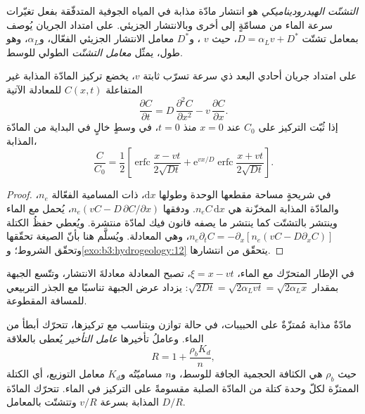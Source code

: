 \begin{definition}\label{def:b3:hydrogeology:ade}
\emph{التشتّت الهيدروديناميكي} هو
انتشار مادّة مذابة في المياه الجوفية المتدفّقة بفعل تغيّرات
سرعة الماء من مسامّةٍ إلى أخرى وبالانتشار الجزيئي. على امتداد
الجريان يُوصف بمعامل تشتّت $D = \alpha_Lv + D^*$،
حيث $v$ ، و$D^*$ معامل الانتشار الجزيئي الفعّال،
و$\alpha_L$، وهو طول، يمثّل
\emph{معامل التشتّت} الطولي للوسط.
\end{definition}

\begin{theorem}\label{thm:b3:hydrogeology:ade}
على امتداد جريان أحادي البعد ذي سرعة تسرّب ثابتة $v$، يخضع
تركيز المادّة المذابة غير المتفاعلة $C(x, t)$ للمعادلة الآتية
\[
\frac{\partial C}{\partial t} = D\,\frac{\partial^2C}{\partial x^2} -
v\,\frac{\partial C}{\partial x} .
\]
إذا ثُبّت التركيز على $C_0$ عند $x = 0$ منذ $t = 0$، في وسطٍ
خالٍ في البداية من المادّة المذابة،
\[
\frac{C}{C_0} = \frac12\left[\operatorname{erfc}\frac{x - vt}{2\sqrt{Dt}} +
\mathrm e^{vx/D}\operatorname{erfc}\frac{x + vt}{2\sqrt{Dt}}\right] .
\]
\end{theorem}

\begin{proof}
في شريحةٍ مساحة مقطعها الوحدة وطولها $\mathrm dx$، ذات
المسامية الفعّالة $n_e$، والمادّة المذابة المخزّنة هي $n_eC\,\mathrm dx$. ودفقها
$n_e(vC - D\,\partial C/\partial x)$، يُحمل مع الماء وينتشر بالتشتّت
كما ينتشر ما يصفه قانون فيك لمادّة منتشرة. ويُعطي حفظُ الكتلة
$n_e\partial_tC = -\partial_x[n_e(vC - D\partial_xC)]$، وهي المعادلة. ويُسلَّم هنا
بأنّ الصيغة تحقّقها وتحقّق الشروط؛
و\cref{exo:b3:hydrogeology:12} يتحقّق من انتشارها.
\end{proof}

في الإطار المتحرّك مع الماء، $\xi = x - vt$، تصبح المعادلة
معادلةَ الانتشار، وتتّسع الجبهة بمقدار $\sqrt{2Dt} = \sqrt{2\alpha_L
vt} = \sqrt{2\alpha_Lx}$: يزداد عرض الجبهة تناسبًا مع الجذر التربيعي
للمسافة المقطوعة.

\begin{definition}\label{def:b3:hydrogeology:retardation}
مادّةٌ مذابة مُمتزّةٌ على الحبيبات، في حالة توازن وبتناسب مع تركيزها،
تتحرّك أبطأ من الماء. وعاملُ تأخيرها
\emph{عامل التأخير} يُعطى بالعلاقة
\[
R = 1 + \frac{\rho_bK_d}{n} ,
\]
حيث $\rho_b$ هي الكثافة الحجمية الجافة للوسط، و$n$ مساميّتُه
و$K_d$ معامل التوزيع، أي الكتلة الممتزّة لكلّ وحدة كتلة من
المادّة الصلبة مقسومةً على التركيز في الماء. تتحرّك المادّة المذابة بسرعة $v/R$
وتتشتّت بالمعامل $D/R$.
\end{definition}

